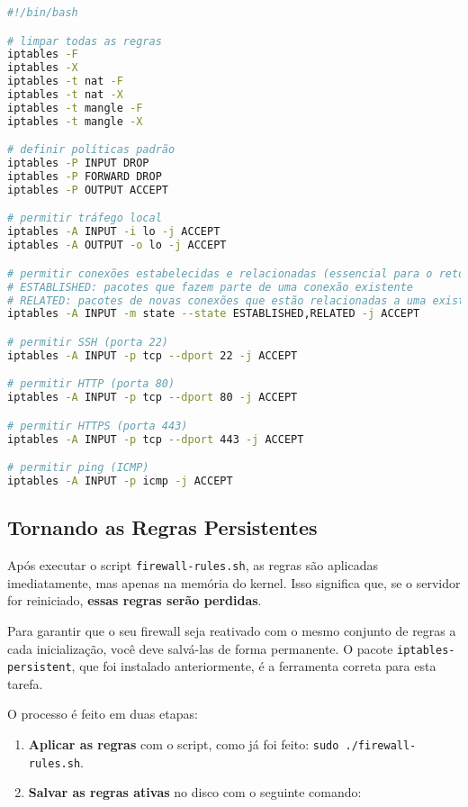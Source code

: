 ﻿\documentclass[12pt,fleqn]{article}
\begin{document}
\begin{lstlisting}[language=bash, caption=Configuração Básica de firewall]
#!/bin/bash

# limpar todas as regras
iptables -F
iptables -X
iptables -t nat -F
iptables -t nat -X
iptables -t mangle -F
iptables -t mangle -X

# definir políticas padrão
iptables -P INPUT DROP
iptables -P FORWARD DROP
iptables -P OUTPUT ACCEPT

# permitir tráfego local
iptables -A INPUT -i lo -j ACCEPT
iptables -A OUTPUT -o lo -j ACCEPT

# permitir conexões estabelecidas e relacionadas (essencial para o retorno de pacotes)
# ESTABLISHED: pacotes que fazem parte de uma conexão existente
# RELATED: pacotes de novas conexões que estão relacionadas a uma existente (ex: FTP)
iptables -A INPUT -m state --state ESTABLISHED,RELATED -j ACCEPT

# permitir SSH (porta 22)
iptables -A INPUT -p tcp --dport 22 -j ACCEPT

# permitir HTTP (porta 80)
iptables -A INPUT -p tcp --dport 80 -j ACCEPT

# permitir HTTPS (porta 443)
iptables -A INPUT -p tcp --dport 443 -j ACCEPT

# permitir ping (ICMP)
iptables -A INPUT -p icmp -j ACCEPT
\end{lstlisting}

\subsection{Tornando as Regras Persistentes}

Após executar o script \texttt{firewall-rules.sh}, as regras são aplicadas imediatamente, mas apenas na memória do kernel. Isso significa que, se o servidor for reiniciado, \textbf{essas regras serão perdidas}.

Para garantir que o seu firewall seja reativado com o mesmo conjunto de regras a cada inicialização, você deve salvá-las de forma permanente. O pacote \texttt{iptables-persistent}, que foi instalado anteriormente, é a ferramenta correta para esta tarefa.

O processo é feito em duas etapas:
\begin{enumerate}
    \item \textbf{Aplicar as regras} com o script, como já foi feito: \texttt{sudo ./firewall-rules.sh}.
    \item \textbf{Salvar as regras ativas} no disco com o seguinte comando:
\end{enumerate}
\end{document}
